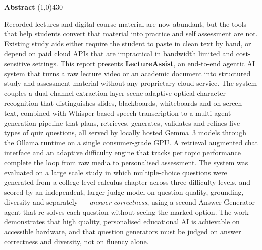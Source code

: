 \setlength{\headheight}{14pt}
\begin{center}
	{\huge \bf Abstract}
	\line(1,0){430}
\end{center}

Recorded lectures and digital course material are now abundant, but the tools
that help students convert that material into practice and self assessment are
not. Existing study aids either require the student to paste in clean text by
hand, or depend on paid cloud APIs that are impractical in bandwidth limited and
cost-sensitive settings. This report presents \textbf{LectureAssist}, an
end-to-end agentic AI system that turns a raw lecture video or an academic
document into structured study and assessment material without any proprietary
cloud service. The system couples a dual-channel extraction layer scene-adaptive
optical character recognition that distinguishes slides, blackboards, whiteboards
and on-screen text, combined with Whisper-based speech transcription to a
multi-agent generation pipeline that plans, retrieves, generates, validates and
refines five types of quiz questions, all served by locally hosted Gemma~3 models
through the Ollama runtime on a single consumer-grade GPU. A retrieval augmented
chat interface and an adaptive difficulty engine that tracks per topic performance
complete the loop from raw media to personalised assessment. The system was
evaluated on a large scale study in which multiple-choice questions were generated
from a college-level calculus chapter across three difficulty levels, and scored by
an independent, larger judge model on question quality, grounding, diversity and
separately --- \emph{answer correctness}, using a second Answer Generator agent
that re-solves each question without seeing the marked option. The work demonstrates that high quality, personalised educational AI
is achievable on accessible hardware, and that question generators must be judged
on answer correctness and diversity, not on fluency alone.
\clearpage
\setlength{\headheight}{12pt}

